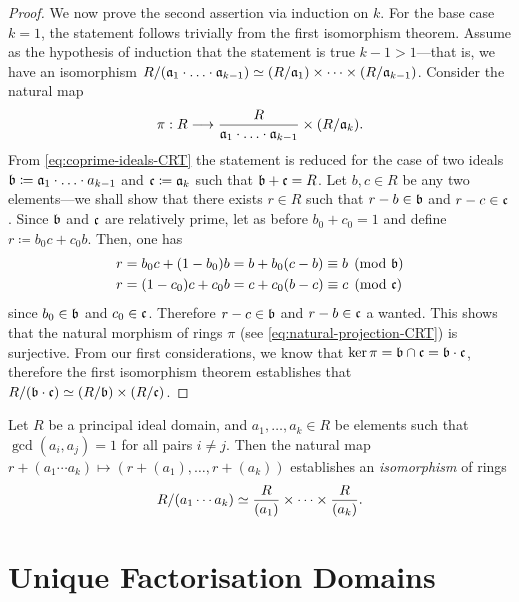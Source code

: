 \begin{proof}
    We now prove the second assertion via induction on \(k\). For the base case
    \(k = 1\), the statement follows trivially from the first isomorphism
    theorem. Assume as the hypothesis of induction that the statement is true
    \(k - 1 > 1\)---that is, we have an isomorphism
    \(R/(\mathfrak{a}_1 \cdot \ldots \cdot \mathfrak{a}_{k-1}) \simeq (R/\mathfrak{a}_1) \times
    \dots \times (R/\mathfrak{a}_{k-1})\). Consider the natural map
    \begin{equation}\label{eq:natural-projection-CRT}
        \pi: R \longrightarrow \frac{R}{\mathfrak{a}_{1} \cdot \ldots \cdot \mathfrak{a}_{k-1}}
        \times (R/\mathfrak{a}_k).
    \end{equation}
    From \cref{eq:coprime-ideals-CRT} the statement is reduced for the case of two
    ideals \(\mathfrak{b} \coloneq \mathfrak{a}_1 \cdot \ldots \cdot a_{k-1}\) and
    \(\mathfrak{c} \coloneq \mathfrak{a}_k\) such that \(\mathfrak{b} + \mathfrak{c} = R\). Let
    \(b, c \in R\) be any two elements---we shall show that there exists \(r \in R\)
    such that \(r - b \in \mathfrak{b}\) and \(r - c \in \mathfrak{c}\). Since \(\mathfrak{b}\)
    and \(\mathfrak{c}\) are relatively prime, let as before \(b_0 + c_0 = 1\) and
    define \(r \coloneq b_0 c + c_0 b\). Then, one has
    \begin{align*}
        r & = b_0 c + (1 - b_0) b = b + b_0 (c - b) \equiv b \pmod{\mathfrak{b}} \\
        r & = (1 - c_0) c + c_0 b = c + c_0 (b - c) \equiv c \pmod{\mathfrak{c}}
    \end{align*}
    since \(b_0 \in \mathfrak{b}\) and \(c_0 \in \mathfrak{c}\). Therefore
    \(r - c \in \mathfrak{b}\) and \(r - b \in \mathfrak{c}\) a wanted. This shows that the
    natural morphism of rings \(\pi\) (see \cref{eq:natural-projection-CRT}) is
    surjective. From our first considerations, we know that
    \(\ker \pi = \mathfrak{b} \cap \mathfrak{c} = \mathfrak{b} \cdot \mathfrak{c}\), therefore the
    first isomorphism theorem establishes that
    \(R/(\mathfrak{b} \cdot \mathfrak{c}) \simeq (R/\mathfrak{b}) \times (R/\mathfrak{c})\).
\end{proof}

\begin{corollary}
    \label{cor:chinese-remainder-for-PID}
    Let \(R\) be a principal ideal domain, and \(a_1, \dots, a_k \in R\) be elements
    such that \(\gcd(a_i, a_j) = 1\) for all pairs \(i \neq j\). Then the natural
    map \(r + (a_1 \cdots a_k) \mapsto (r + (a_1), \dots, r + (a_k))\) establishes an
    \emph{isomorphism} of rings
    \[
        R/(a_1 \cdots a_k) \simeq \frac{R}{(a_{1})} \times \dots \times \frac{R}{(a_k)}.
    \]
\end{corollary}

\section{Unique Factorisation Domains}


